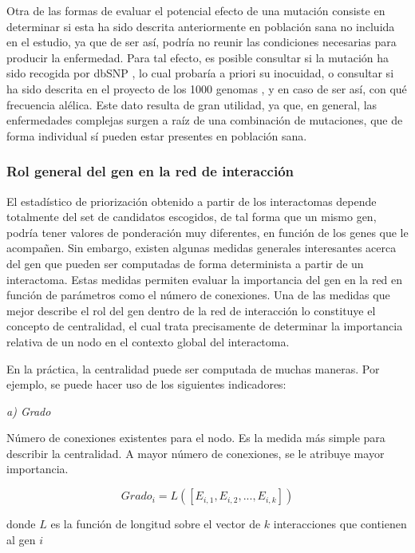 \medskip
Otra de las formas de evaluar el potencial efecto de una mutación consiste en determinar si esta ha sido descrita anteriormente en población sana no incluida en el estudio, ya que de ser así, podría no reunir las condiciones necesarias para producir la enfermedad. Para tal efecto, es posible consultar si la mutación ha sido recogida por dbSNP \cite{dbsnp}, lo cual probaría a priori su inocuidad, o consultar si ha sido descrita en el proyecto de los 1000 genomas \cite{1000genomes}, y en caso de ser así, con qué frecuencia alélica. Este dato resulta de gran utilidad, ya que, en general, las enfermedades complejas surgen a raíz de una combinación de mutaciones, que de forma individual sí pueden estar presentes en población sana.
  

  \subsubsection{Rol general del gen en la red de interacción}

El estadístico de priorización obtenido a partir de los interactomas depende totalmente del set de candidatos escogidos, de tal forma que un mismo gen, podría tener valores de ponderación muy diferentes, en función de los genes que le acompañen. Sin embargo, existen algunas medidas generales interesantes acerca del gen que pueden ser computadas de forma determinista a partir de un interactoma. Estas medidas permiten evaluar la importancia del gen en la red en función de parámetros como el número de conexiones. Una de las medidas que mejor describe el rol del gen dentro de la red de interacción lo constituye el concepto de centralidad, el cual trata precisamente de determinar la importancia relativa de un nodo en el contexto global del interactoma. 

\medskip
En la práctica, la centralidad puede ser computada de muchas maneras. Por ejemplo, se puede hacer uso de los siguientes indicadores:

\bigskip
\textit{a) Grado\\}

Número de conexiones existentes para el nodo. Es la medida más simple para describir la centralidad. A mayor número de conexiones, se le atribuye mayor importancia.

\begin{equation}
Grado_i = L([E_{i,1},E_{i,2},...,E_{i,k}])
\end{equation}

donde $L$ es la función de longitud sobre el vector de $k$ interacciones que contienen al gen $i$


